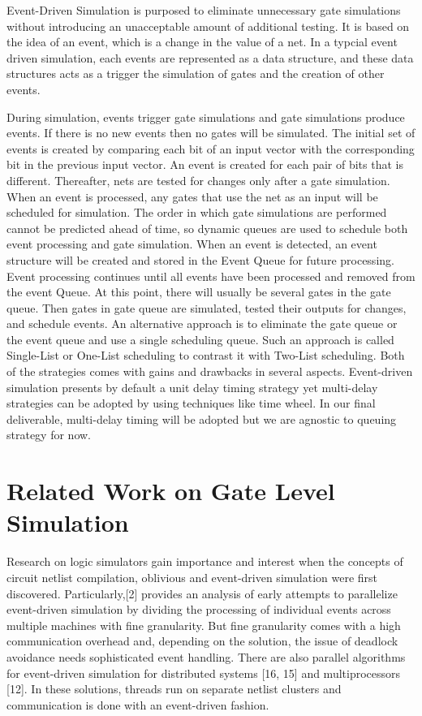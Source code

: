 \documentclass[12pt]{report}
\begin{document}
 Event-Driven Simulation is purposed to eliminate unnecessary gate simulations
 without introducing an unacceptable amount of additional testing. It is based on the idea of an event, which is a change in the value of a net. In a typcial event driven simulation, each events are represented as a data structure,
 and these data structures acts as a trigger the simulation of gates and the creation of other events.
 
 During simulation, events trigger gate simulations and gate simulations produce
 events. If there is no new events then no gates will be simulated. The initial set of events is created by comparing each bit of an input vector with the corresponding bit in the previous input vector. An event is created for each pair of bits that is different. Thereafter, nets are tested for changes only after a gate simulation. When an event is processed, any gates that use the net as an input will be scheduled for simulation. The order in which gate simulations are performed cannot be predicted ahead of time, so dynamic queues are used to schedule both event processing and gate simulation. When an event is detected, an event structure will be created and stored in the Event
 Queue for future processing. Event processing continues until all events have been processed and removed from the event Queue. At this point, there will usually be several gates in the gate queue. Then gates in gate queue are simulated, tested their outputs for changes, and schedule events. An alternative approach is to eliminate the gate queue or the event queue and use a single scheduling queue. Such an approach is called Single-List or One-List scheduling to contrast it with Two-List scheduling. Both of the strategies comes with gains and drawbacks in several aspects. Event-driven simulation presents by default a unit delay timing strategy yet multi-delay strategies can be adopted by using techniques like time wheel. In our final deliverable, multi-delay timing will be adopted but we are agnostic to queuing strategy for now.
 
 
   
 
 \section{Related Work on Gate Level Simulation}
 
Research on logic simulators gain importance and interest when the
concepts of circuit netlist compilation, oblivious and event-driven
simulation were first discovered. Particularly,[2] provides
an analysis of early attempts to parallelize event-driven
simulation by dividing the processing of individual events
across multiple machines with fine granularity. But fine granularity
comes with a high communication overhead and, depending
on the solution, the issue of deadlock avoidance needs sophisticated
event handling. There are also parallel algorithms for event-driven simulation
for distributed systems [16, 15] and multiprocessors
[12]. In these solutions, threads run on separate netlist clusters and communication is done with an event-driven fashion.  
\end{document}
